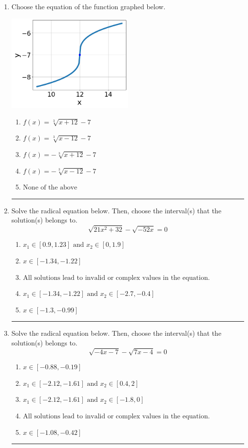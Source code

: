 \documentclass[14pt]{extbook}
\newcommand{\litem}[1]{\item#1\hspace*{-1cm}\rule{\textwidth}{0.4pt}}
\begin{document}
\begin{enumerate}
{\begin{enumerate}[label=\Alph*.]
\end{enumerate} }
\litem{
Choose the equation of the function graphed below.
\begin{center}
    \includegraphics[width=0.5\textwidth]{../Figures/radicalGraphToEquationB.png}
\end{center}
\begin{enumerate}[label=\Alph*.]
\item \( f(x) = \sqrt[3]{x + 12} - 7 \)
\item \( f(x) = \sqrt[3]{x - 12} - 7 \)
\item \( f(x) = - \sqrt[3]{x + 12} - 7 \)
\item \( f(x) = - \sqrt[3]{x - 12} - 7 \)
\item \( \text{None of the above} \)

\end{enumerate} }
\litem{
Solve the radical equation below. Then, choose the interval(s) that the solution(s) belongs to.\[ \sqrt{21 x^2 + 32} - \sqrt{-52 x} = 0 \]\begin{enumerate}[label=\Alph*.]
\item \( x_1 \in [0.9, 1.23] \text{ and } x_2 \in [0,1.9] \)
\item \( x \in [-1.34,-1.22] \)
\item \( \text{All solutions lead to invalid or complex values in the equation.} \)
\item \( x_1 \in [-1.34, -1.22] \text{ and } x_2 \in [-2.7,-0.4] \)
\item \( x \in [-1.3,-0.99] \)

\end{enumerate} }
\litem{
Solve the radical equation below. Then, choose the interval(s) that the solution(s) belongs to.\[ \sqrt{-4 x - 7} - \sqrt{7 x - 4} = 0 \]\begin{enumerate}[label=\Alph*.]
\item \( x \in [-0.88,-0.19] \)
\item \( x_1 \in [-2.12, -1.61] \text{ and } x_2 \in [0.4,2] \)
\item \( x_1 \in [-2.12, -1.61] \text{ and } x_2 \in [-1.8,0] \)
\item \( \text{All solutions lead to invalid or complex values in the equation.} \)
\item \( x \in [-1.08,-0.42] \)


\end{enumerate}}
\end{enumerate}
\end{document}
